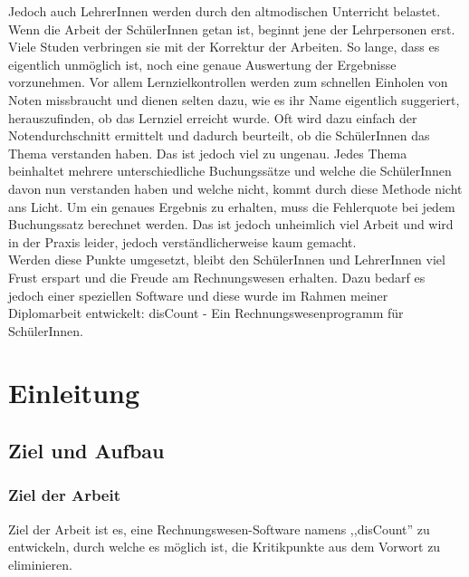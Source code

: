 \documentclass[12pt]{report}
\begin{document}
\noindent Jedoch auch LehrerInnen werden durch den altmodischen Unterricht belastet. Wenn die Arbeit der SchülerInnen getan ist, beginnt jene der Lehrpersonen erst. Viele Studen verbringen sie mit der Korrektur der Arbeiten. So lange, dass es eigentlich unmöglich ist, noch eine genaue Auswertung der Ergebnisse vorzunehmen. Vor allem Lernzielkontrollen werden zum schnellen Einholen von Noten missbraucht und dienen selten dazu, wie es ihr Name eigentlich suggeriert, herauszufinden, ob das Lernziel erreicht wurde. Oft wird dazu einfach der Notendurchschnitt ermittelt und dadurch beurteilt, ob die SchülerInnen das Thema verstanden haben. Das ist jedoch viel zu ungenau. Jedes Thema beinhaltet mehrere unterschiedliche Buchungssätze und welche die SchülerInnen davon nun verstanden haben und welche nicht, kommt durch diese Methode nicht ans Licht. Um ein genaues Ergebnis zu erhalten, muss die Fehlerquote bei jedem Buchungssatz berechnet werden. Das ist jedoch unheimlich viel Arbeit und wird in der Praxis leider, jedoch verständlicherweise kaum gemacht.\\

\noindent Werden diese Punkte umgesetzt, bleibt den SchülerInnen und LehrerInnen viel Frust erspart und die Freude am Rechnungswesen erhalten. Dazu bedarf es jedoch einer speziellen Software und diese wurde im Rahmen meiner Diplomarbeit entwickelt: disCount - Ein Rechnungswesenprogramm für SchülerInnen.
  
\newpage
  




  
\tableofcontents



\part{Einleitung} 

    
   

  
\chapter{Ziel und Aufbau}
\section{Ziel der Arbeit}
Ziel der Arbeit ist es, eine Rechnungswesen-Software namens ,,disCount'' zu entwickeln, durch welche es möglich ist, die Kritikpunkte aus dem Vorwort zu eliminieren.
\end{document}
